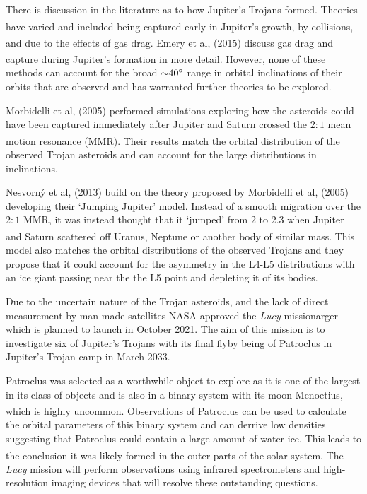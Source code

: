 \documentclass[10pt, twocolumn]{revtex4}    %
\newcommand{\scite}[1]{\textsuperscript{\cite{#1}}}
\begin{document}
There is discussion in the literature as to how Jupiter's Trojans formed. Theories have varied and included being captured early in Jupiter's growth,\scite{FlemingoriginTrojanasteroids2000} by collisions,\scite{ShoemakerTrojanasteroidsPopulations1989} and due to the effects of gas drag.\scite{KortenkampCaptureTrojanAsteroids2001} Emery et al, (2015) discuss gas drag and capture during Jupiter's formation in more detail.\textsuperscript{\cite{EmeryComplexHistoryTrojan2015}} However, none  of these methods can account for the broad ${\sim}40\degree$ range in orbital inclinations of their orbits that are observed and has warranted further theories to be explored.

Morbidelli et al, (2005) performed simulations exploring how the asteroids could have been captured immediately after Jupiter and Saturn crossed the $2{:}1$ mean motion resonance (MMR).\textsuperscript{\cite{MorbidelliChaoticcaptureJupiter2005a}} Their results match the orbital distribution of the observed Trojan asteroids and can account for the large distributions in inclinations.
 
Nesvorn\'y et al, (2013) build on the theory proposed by Morbidelli et al, (2005) developing their `Jumping Jupiter' model. Instead of a smooth migration over the $2{:}1$ MMR, it was instead thought that it `jumped' from $2$ to $2.3$ when Jupiter and Saturn scattered off Uranus, Neptune or another body of similar mass.\scite{NesvornyCaptureTrojansJumping2013} This model also matches the orbital distributions of the observed Trojans and they propose that it could account for the asymmetry in the L4-L5 distributions with an ice giant passing near the the L5 point and depleting it of its bodies.

Due to the uncertain nature of the Trojan asteroids, and the lack of direct measurement by man-made satellites NASA approved the \textit{Lucy} missionarger which is planned to launch in October 2021. The aim of this mission is to investigate six of Jupiter's Trojans with its final flyby being of Patroclus in Jupiter's Trojan camp in March 2033. 

Patroclus was selected as a worthwhile object to explore as it is one of the largest in its class of objects and is also in a binary system with its moon Menoetius, which is highly uncommon.\scite{BuieSIZESHAPESTELLAR2015} Observations of Patroclus can be used to calculate the orbital parameters of this binary system and can derrive low densities suggesting that Patroclus could contain a large amount of water ice. This leads to the conclusion it was likely formed in the outer parts of the solar system.\scite{Marchislowdensity8gcm32006}\scite{YangSpectroscopicSearchWater2006} The \textit{Lucy} mission will perform observations using infrared spectrometers and high-resolution imaging devices that will resolve these outstanding questions. 
\end{document}
